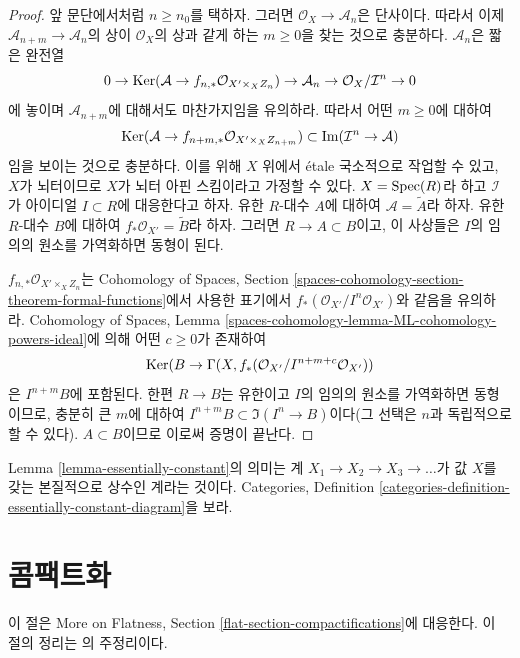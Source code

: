 \begin{proof}
\medskip\noindent
앞 문단에서처럼 $n \geq n_0$를 택하자. 그러면
$\mathcal{O}_X \to \mathcal{A}_n$은 단사이다. 따라서 이제
$\mathcal{A}_{n + m} \to \mathcal{A}_n$의 상이
$\mathcal{O}_X$의 상과 같게 하는 $m \geq 0$을 찾는 것으로 충분하다.
$\mathcal{A}_n$은 짧은 완전열
$$
0 \to \mathop{\mathrm{Ker}}(\mathcal{A} \to f_{n, *}\mathcal{O}_{X' \times_X Z_n})
\to \mathcal{A}_n \to \mathcal{O}_X/\mathcal{I}^n \to 0
$$
에 놓이며 $\mathcal{A}_{n + m}$에 대해서도 마찬가지임을 유의하라.
따라서 어떤 $m \geq 0$에 대하여
$$
\mathop{\mathrm{Ker}}(\mathcal{A} \to f_{n + m, *}\mathcal{O}_{X' \times_X Z_{n + m}})
\subset
\mathop{\mathrm{Im}}(\mathcal{I}^n \to \mathcal{A})
$$
임을 보이는 것으로 충분하다. 이를 위해 $X$ 위에서 \'etale 국소적으로
작업할 수 있고, $X$가 뇌터이므로 $X$가 뇌터 아핀 스킴이라고 가정할 수
있다. $X = \mathop{\mathrm{Spec}}(R)$라 하고 $\mathcal{I}$가 아이디얼 $I \subset R$에
대응한다고 하자. 유한 $R$-대수 $A$에 대하여
$\mathcal{A} = \widetilde{A}$라 하자. 유한 $R$-대수 $B$에 대하여
$f_*\mathcal{O}_{X'} = \widetilde{B}$라 하자. 그러면
$R \to A \subset B$이고, 이 사상들은 $I$의 임의의 원소를 가역화하면
동형이 된다.

\medskip\noindent
$f_{n, *}\mathcal{O}_{X' \times_X Z_n}$는 Cohomology of Spaces, Section
\ref{spaces-cohomology-section-theorem-formal-functions}에서 사용한 표기에서
$f_*(\mathcal{O}_{X'}/I^n\mathcal{O}_{X'})$와 같음을 유의하라.
Cohomology of Spaces, Lemma
\ref{spaces-cohomology-lemma-ML-cohomology-powers-ideal}에 의해
어떤 $c \geq 0$가 존재하여
$$
\mathop{\mathrm{Ker}}(B \to \Gamma(X, f_*(\mathcal{O}_{X'}/I^{n + m + c}\mathcal{O}_{X'}))
$$
은 $I^{n + m}B$에 포함된다. 한편 $R \to B$는 유한이고 $I$의 임의의
원소를 가역화하면 동형이므로, 충분히 큰 $m$에 대하여
$I^{n + m}B \subset \Im(I^n \to B)$이다(그 선택은 $n$과 독립적으로
할 수 있다). $A \subset B$이므로 이로써 증명이 끝난다.
\end{proof}

\begin{remark}
\label{remark-essentially-constant}
Lemma \ref{lemma-essentially-constant}의 의미는 계
$X_1 \to X_2 \to X_3 \to \ldots$가 값 $X$를 갖는 본질적으로 상수인
계라는 것이다. Categories, Definition
\ref{categories-definition-essentially-constant-diagram}을 보라.
\end{remark}

\section{콤팩트화}
\label{section-compactifications}

\noindent
이 절은 More on Flatness, Section
\ref{flat-section-compactifications}에 대응한다. 이 절의 정리는
\cite{CLO}의 주정리이다.

